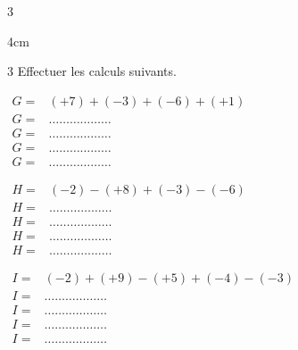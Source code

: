 \documentclass[a4paper]{book}
\begin{document}
{\begin{exerciceNote}{3}
\begin{minipage}{0.32\linewidth}
            \begin{ZoneReponse}{4cm}
            \end{ZoneReponse}
        \end{minipage}
    \end{exerciceNote}


    \begin{exerciceNote}{3}  
        Effectuer les calculs suivants.

        \medskip
        
        \noindent    
        \begin{minipage}{0.31\linewidth}
            $\begin{array}{ll}
                G =& (+7) + (-3) + (-6) + (+1) \\[2ex]
                G =& \dots\dots\dots\dots\dots\dots \\[2ex]
                G =& \dots\dots\dots\dots\dots\dots \\[2ex]
                G =& \dots\dots\dots\dots\dots\dots \\[2ex]
                G =& \dots\dots\dots\dots\dots\dots
            \end{array}$
        \end{minipage}
        \hfill \vline \hfill
        \begin{minipage}{0.33\linewidth}
            $\begin{array}{ll}
                H =& (-2) - (+8) + (-3) - (-6) \\[2ex]
                H =& \dots\dots\dots\dots\dots\dots \\[2ex]
                H =& \dots\dots\dots\dots\dots\dots \\[2ex]
                H =& \dots\dots\dots\dots\dots\dots \\[2ex]
                H =& \dots\dots\dots\dots\dots\dots
            \end{array}$
        \end{minipage}
        \hfill \vline \hfill
        \begin{minipage}{0.33\linewidth}
            $\begin{array}{ll}
                I =& (-2) + (+9) - (+5) + (-4) - (-3) \\[2ex]
                I =& \dots\dots\dots\dots\dots\dots \\[2ex]
                I =& \dots\dots\dots\dots\dots\dots \\[2ex]
                I =& \dots\dots\dots\dots\dots\dots \\[2ex]
                I =& \dots\dots\dots\dots\dots\dots
            \end{array}$
        \end{minipage}
    \end{exerciceNote}


}
\end{document}
